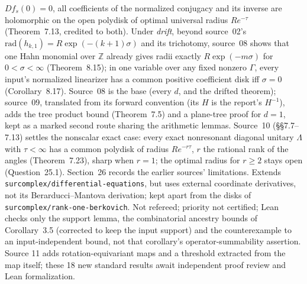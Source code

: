 \documentclass[11pt]{article}
\newcommand{\Z}{\mathbb{Z}}
\begin{document}
{$Df_s(0)=0$, all coefficients of the normalized conjugacy and its inverse are
holomorphic on the open polydisk of optimal universal radius $Re^{-\tau}$
(Theorem~7.13, credited to both).  Under \emph{drift}, beyond source~02's
$\mathrm{rad}(h_{k,1})=R\exp(-(k+1)\sigma)$ and its trichotomy, source~08
shows that one Hahn monomial over $\Z$ already gives radii exactly
$R\exp(-m\sigma)$ for $0<\sigma<\infty$ (Theorem~8.15); in one variable over
any fixed nonzero $\Gamma$, every input's normalized linearizer has a common
positive coefficient disk iff $\sigma=0$ (Corollary~8.17).  Source~08 is the
base (every $d$, and the drifted theorem); source~09, translated from its
forward convention (its $H$ is the report's $H^{-1}$), adds the tree product
bound (Theorem~7.5) and a plane-tree proof for $d=1$, kept as a marked second
route sharing the arithmetic lemmas.  Source~10 (\S\S7.7--7.13) settles the nonscalar exact case: every exact
nonresonant diagonal unitary $\Lambda$ with $\tau<\infty$ has a common polydisk
of radius $Re^{-r\tau}$, $r$ the rational rank of the angles (Theorem~7.23),
sharp when $r=1$; the optimal radius for $r\ge2$ stays open (Question~25.1).
Section~26 records the earlier sources' limitations.  Extends
\nolinkurl{surcomplex/differential-equations}, but uses external coordinate
derivatives, not its Berarducci--Mantova derivation; kept apart from the disks
of \nolinkurl{surcomplex/rank-one-berkovich}.  Not refereed; priority not
certified; Lean checks only the support lemma, the combinatorial ancestry
bounds of Corollary~3.5 (corrected to keep the input support) and the
counterexample to an input-independent bound, not that corollary's
operator-summability assertion. Source 11 adds rotation-equivariant maps and a threshold extracted from the map itself; these 18 new standard results await independent proof review and Lean formalization.}
\end{document}
